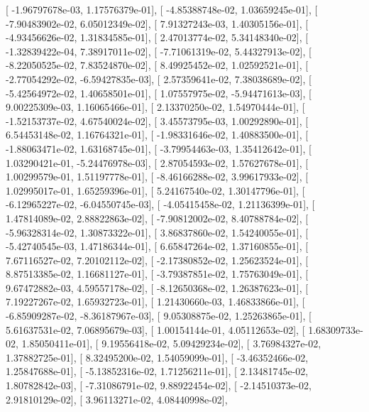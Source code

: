\documentclass{article}
\begin{document}
       [ -1.96797678e-03,   1.17576379e-01],
       [ -4.85388748e-02,   1.03659245e-01],
       [ -7.90483902e-02,   6.05012349e-02],
       [  7.91327243e-03,   1.40305156e-01],
       [ -4.93456626e-02,   1.31834585e-01],
       [  2.47013774e-02,   5.34148340e-02],
       [ -1.32839422e-04,   7.38917011e-02],
       [ -7.71061319e-02,   5.44327913e-02],
       [ -8.22050525e-02,   7.83524870e-02],
       [  8.49925452e-02,   1.02592521e-01],
       [ -2.77054292e-02,  -6.59427835e-03],
       [  2.57359641e-02,   7.38038689e-02],
       [ -5.42564972e-02,   1.40658501e-01],
       [  1.07557975e-02,  -5.94471613e-03],
       [  9.00225309e-03,   1.16065466e-01],
       [  2.13370250e-02,   1.54970444e-01],
       [ -1.52153737e-02,   4.67540024e-02],
       [  3.45573795e-03,   1.00292890e-01],
       [  6.54453148e-02,   1.16764321e-01],
       [ -1.98331646e-02,   1.40883500e-01],
       [ -1.88063471e-02,   1.63168745e-01],
       [ -3.79954463e-03,   1.35412642e-01],
       [  1.03290421e-01,  -5.24476978e-03],
       [  2.87054593e-02,   1.57627678e-01],
       [  1.00299579e-01,   1.51197778e-01],
       [ -8.46166288e-02,   3.99617933e-02],
       [  1.02995017e-01,   1.65259396e-01],
       [  5.24167540e-02,   1.30147796e-01],
       [ -6.12965227e-02,  -6.04550745e-03],
       [ -4.05415458e-02,   1.21136399e-01],
       [  1.47814089e-02,   2.88822863e-02],
       [ -7.90812002e-02,   8.40788784e-02],
       [ -5.96328314e-02,   1.30873322e-01],
       [  3.86837860e-02,   1.54240055e-01],
       [ -5.42740545e-03,   1.47186344e-01],
       [  6.65847264e-02,   1.37160855e-01],
       [  7.67116527e-02,   7.20102112e-02],
       [ -2.17380852e-02,   1.25623524e-01],
       [  8.87513385e-02,   1.16681127e-01],
       [ -3.79387851e-02,   1.75763049e-01],
       [  9.67472882e-03,   4.59557178e-02],
       [ -8.12650368e-02,   1.26387623e-01],
       [  7.19227267e-02,   1.65932723e-01],
       [  1.21430660e-03,   1.46833866e-01],
       [ -6.85909287e-02,  -8.36187967e-03],
       [  9.05308875e-02,   1.25263865e-01],
       [  5.61637531e-02,   7.06895679e-03],
       [  1.00154144e-01,   4.05112653e-02],
       [  1.68309733e-02,   1.85050411e-01],
       [  9.19556418e-02,   5.09429234e-02],
       [  3.76984327e-02,   1.37882725e-01],
       [  8.32495200e-02,   1.54059099e-01],
       [ -3.46352466e-02,   1.25847688e-01],
       [ -5.13852316e-02,   1.71256211e-01],
       [  2.13481745e-02,   1.80782842e-03],
       [ -7.31086791e-02,   9.88922454e-02],
       [ -2.14510373e-02,   2.91810129e-02],
       [  3.96113271e-02,   4.08440998e-02],
\end{document}
